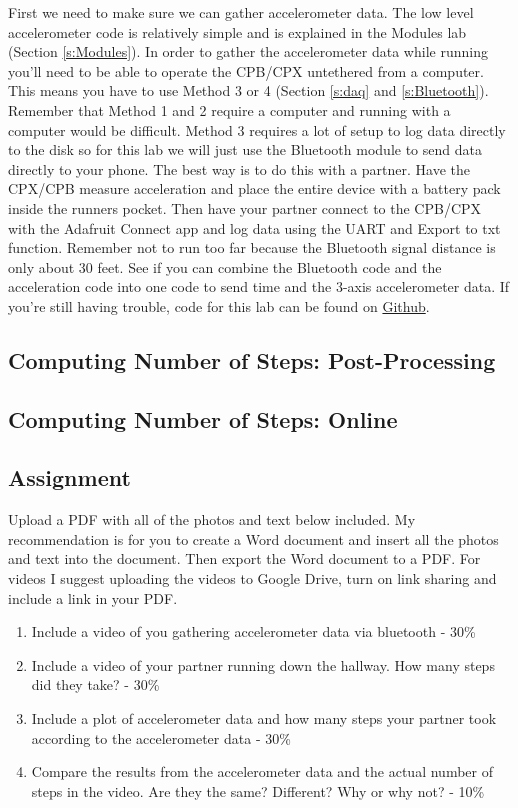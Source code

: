 First we need to make sure we can gather accelerometer data. The low level accelerometer code is relatively simple and is explained in the Modules lab (Section \ref{s:Modules}). In order to gather the accelerometer data while running you'll need to be able to operate the CPB/CPX untethered from a computer. This means you have to use Method 3 or 4 (Section \ref{s:daq} and \ref{s:Bluetooth}). Remember that Method 1 and 2 require a computer and running with a computer would be difficult. Method 3 requires a lot of setup to log data directly to the disk so for this lab we will just use the Bluetooth module to send data directly to your phone. The best way is to do this with a partner. Have the CPX/CPB measure acceleration and place the entire device with a battery pack inside the runners pocket. Then have your partner connect to the CPB/CPX with the Adafruit Connect app and log data using the UART and Export to txt function. Remember not to run too far because the Bluetooth signal distance is only about 30 feet. See if you can combine the Bluetooth code and the acceleration code into one code to send time and the 3-axis accelerometer data. If you're still having trouble, code for this lab can be found on \href{https://github.com/cmontalvo251/Microcontrollers/tree/master/Circuit_Playground/CircuitPython/pedometer}{Github}. 

\subsection{Computing Number of Steps: Post-Processing}

\subsection{Computing Number of Steps: Online}

\subsection{Assignment}

Upload a PDF with all of the photos and text below included. My recommendation is for you to create a Word document and insert all the photos and text into the document. Then export the Word document to a PDF. For videos I suggest uploading the videos to Google Drive, turn on link sharing and include a link in your PDF.

\begin{enumerate}[itemsep=-5pt]
\item Include a video of you gathering accelerometer data via bluetooth - 30\%
\item Include a video of your partner running down the hallway. How many steps did they take? - 30\%
\item Include a plot of accelerometer data and how many steps your partner took according to the accelerometer data - 30\%
\item Compare the results from the accelerometer data and the actual number of steps in the video. Are they the same? Different? Why or why not? - 10\%
\end{enumerate}